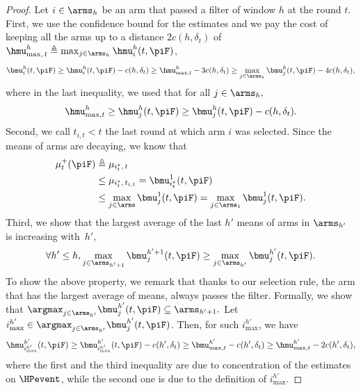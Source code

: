 \begin{proof}
Let $i \in \arms_h$ be an arm that passed a filter of window $h$ at the round $t$.
First, we use the confidence bound for the estimates and we pay the cost of keeping all the arms up to a distance $2c(h,  \delta_t)$ of $\hmu^{h}_{\max,\, t} \triangleq \max_{j \in \arms_h} \hmu_i^h(t,\piF)$,
\begin{equation}
\label{1}
\bmu_i^h(t,\piF)\geq \hmu_i^h(t,\piF)- c(h,  \delta_t) \geq \hmu^h_{\max,t} - 3c(h, \delta_t)
\geq \max_{j \in \arms_h}\bmu_j^h(t,\piF)  - 4 c(h, \delta_t),
\end{equation}
where in the last inequality, we used that for all $j \in \arms_h,$ \[\hmu^{h}_{\max,t} \geq  \hmu_j^h(t,\piF)  \geq \bmu_j^h(t,\piF)  - c(h, \delta_t).\]
Second, we call $t_{i,t} < t$ the last round at which arm $i$ was selected. Since the means of arms are decaying, we know that 
\begin{align}
\label{2}
 \mu^+_t(\piF) &\triangleq \mu_{i^\star_t, \, t} \nonumber\\
 &\leq  \mu_{i^\star_t, \, t_{i,t}} =  \bmu_{i^\star_t}^1(t,\piF)  \nonumber\\
 &\leq \max_{j \in \arms}\bmu_j^1(t,\piF)  = \max_{j \in \arms_1} \bmu_j^1(t,\piF).
\end{align}
Third, we show that the largest average of the last $h'$ means of arms in $\arms_{h'}$ is increasing with~$h'$,
\begin{equation*}
\forall  h' \leq h ,  \max_{j \in \arms_{h'+1}}\bmu_j^{h'+1}(t,\piF)   \geq \max_{j \in \arms_{h'}}\bmu_j^{h'}(t,\piF). 
\end{equation*}
To show the above property, we remark that thanks to our selection rule, the arm that has the largest average of means, always passes the filter. Formally, we show that $\argmax_{j \in \arms_{h'}}\bmu_j^{h'}(t,\piF) \subseteq \arms_{h'+1}.$ 
Let $i^{h'}_{\max} \in \argmax_{j \in \arms_{h'}}\bmu_j^{h'}(t,\piF)$. Then, for such $i^{h'}_{\max}$, we have
\begin{equation*}
\hmu_{i^{h'}_{\max}}^{h'}(t,\piF) \geq \bmu_{i^{h'}_{\max}}^{h'}(t,\piF) - c(h', \delta_t) 
\geq \bmu^{h'}_{\max,t} - c(h', \delta_t) \geq \hmu^{h'}_{\max,t}- 2c(h', \delta_t),
\end{equation*}
where the first and the third inequality are due to concentration of the estimates on $\HPevent$, while the second one is due to the definition of $i^{h'}_{\max}$. 


\end{proof}
